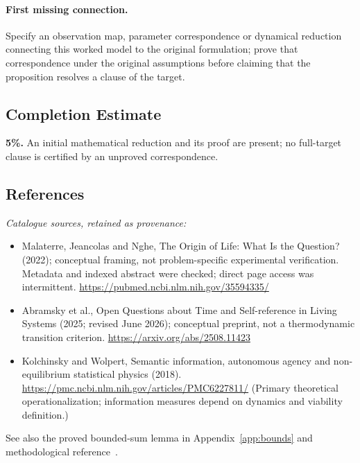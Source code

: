 \documentclass[11pt]{article}
\begin{document}
\paragraph{First missing connection.} Specify an observation map, parameter correspondence or dynamical reduction connecting this worked model to the original formulation; prove that correspondence under the original assumptions before claiming that the proposition resolves a clause of the target.
\subsection{Completion Estimate}
\textbf{5\%.} An initial mathematical reduction and its proof are present; no full-target clause is certified by an unproved correspondence.
\subsection{References}
\noindent\emph{Catalogue sources, retained as provenance:}
\begin{itemize}
\item Malaterre, Jeancolas and Nghe, The Origin of Life: What Is the Question? (2022); conceptual framing, not problem-specific experimental verification. Metadata and indexed abstract were checked; direct page access was intermittent. \url{https://pubmed.ncbi.nlm.nih.gov/35594335/}
\item Abramsky et al., Open Questions about Time and Self-reference in Living Systems (2025; revised June 2026); conceptual preprint, not a thermodynamic transition criterion. \url{https://arxiv.org/abs/2508.11423}
\item Kolchinsky and Wolpert, Semantic information, autonomous agency and non-equilibrium statistical physics (2018). \url{https://pmc.ncbi.nlm.nih.gov/articles/PMC6227811/} (Primary theoretical operationalization; information measures depend on dynamics and viability definition.)
\end{itemize}
\noindent See also the proved bounded-sum lemma in Appendix~\ref{app:bounds} and methodological reference~\cite{hoeffding}.
\end{document}
